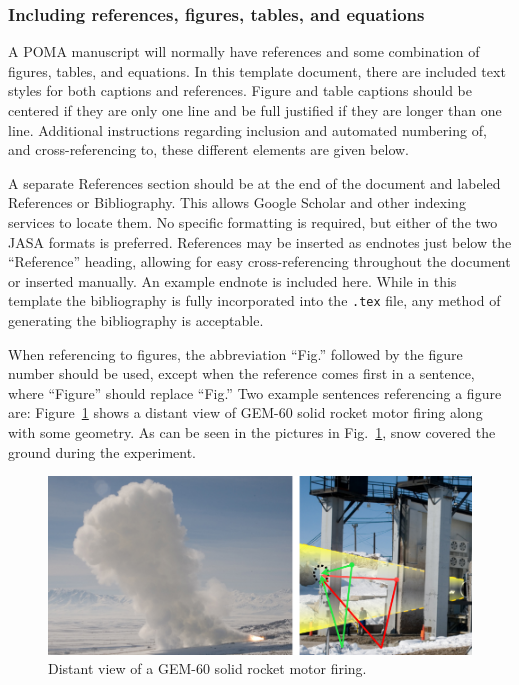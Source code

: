 \documentclass[12pt,letter]{article}
\begin{document}
\subsubsection{Including references, figures, tables, and equations}

A POMA manuscript will normally have references and some combination of figures, tables, and equations. In this template document, there are included text styles for both captions and references.  Figure and table captions should be centered if they are only one line and be full justified if they are longer than one line.  Additional instructions regarding inclusion and automated numbering of, and cross-referencing to, these different elements are given below.

A separate References section should be at the end of the document and labeled References or Bibliography. This allows Google Scholar and other indexing services to locate them.  No specific formatting is required, but either of the two JASA formats is preferred. References may be inserted as endnotes just below the ``Reference'' heading, allowing for easy cross-referencing throughout the document or inserted manually. An example endnote is included here.\cite{daigle79}  While in this template the bibliography is fully incorporated into the \texttt{.tex} file, any method of generating the bibliography is acceptable.

When referencing to figures, the abbreviation ``Fig.'' followed by the figure number should be used, except when the reference comes first in a sentence, where ``Figure'' should replace ``Fig.''  Two example sentences referencing a figure are: Figure~\ref{fig:gem60} shows a distant view of GEM-60 solid rocket motor firing along with some geometry.  As can be seen in the pictures in Fig.~\ref{fig:gem60}, snow covered the ground during the experiment.

\begin{figure}
	\centering
	\includegraphics{GEM60_Picture}
	\caption{\label{fig:gem60}Distant view of a GEM-60 solid rocket motor firing.}
\end{figure}
\end{document}
